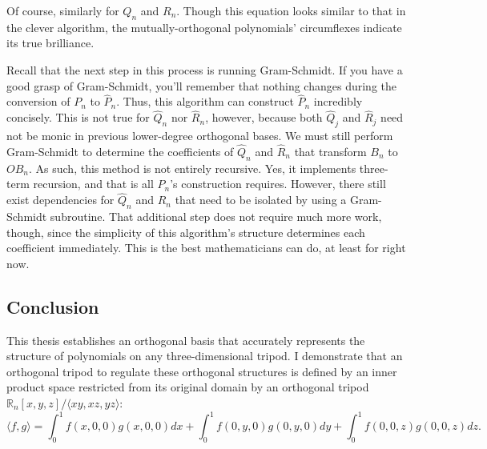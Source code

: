 \documentclass[letterpaper, 12pt]{article}
\begin{document}
\noindent Of course, similarly for $Q_n$ and $R_n$. Though this equation looks similar to that in the clever algorithm, the mutually-orthogonal polynomials' circumflexes indicate its true brilliance.

Recall that the next step in this process is running Gram-Schmidt. If you have a good grasp of Gram-Schmidt, you'll remember that nothing changes during the conversion of $P_n$ to $\hat{P}_n$. Thus, this algorithm can construct $\hat{P}_n$ incredibly concisely. This is not true for $\hat{Q}_n$ nor $\hat{R}_n$, however, because both $\hat{Q}_j$ and $\hat{R}_j$ need not be monic in previous lower-degree orthogonal bases. We must still perform Gram-Schmidt to determine the coefficients of $\hat{Q}_n$ and $\hat{R}_n$ that transform $B_n$ to $OB_n$. As such, this method is not entirely recursive. Yes, it implements three-term recursion, and that is all $\hat{P}_n$'s construction requires. However, there still exist dependencies for $\hat{Q}_n$ and $\hat{R}_n$ that need to be isolated by using a Gram-Schmidt subroutine. That additional step does not require much more work, though, since the simplicity of this algorithm's structure determines each coefficient immediately. This is the best mathematicians can do, at least for right now.







\newpage
{}
\begin{centering}\section*{Conclusion}\end{centering}

This thesis establishes an orthogonal basis that accurately represents the structure of polynomials on any three-dimensional tripod. I demonstrate that an orthogonal tripod to regulate these orthogonal structures is defined by an inner product space restricted from its original domain by an orthogonal tripod $\mathbb{R}_n [x, y, z] / \langle xy, xz, yz \rangle$:
$$\langle f, g\rangle = \int_0^1 f(x,0,0)g(x,0,0) dx + \int_0^1 f(0,y,0)g(0,y,0) dy + \int_0^1 f(0,0,z)g(0,0,z) dz.$$
\end{document}
